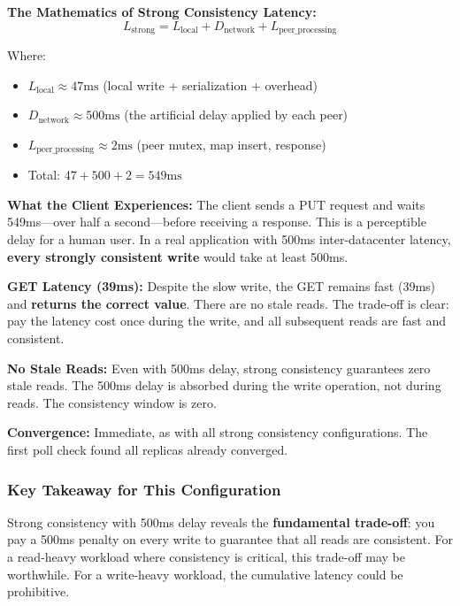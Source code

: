 \documentclass[10pt,a4paper]{article}
\begin{document}
\textbf{The Mathematics of Strong Consistency Latency:}
\begin{equation}
L_{\text{strong}} = L_{\text{local}} + D_{\text{network}} + L_{\text{peer\_processing}}
\end{equation}

Where:
\begin{itemize}
    \item $L_{\text{local}} \approx 47\text{ms}$ (local write + serialization + overhead)
    \item $D_{\text{network}} \approx 500\text{ms}$ (the artificial delay applied by each peer)
    \item $L_{\text{peer\_processing}} \approx 2\text{ms}$ (peer mutex, map insert, response)
    \item Total: $47 + 500 + 2 = 549\text{ms}$
\end{itemize}

\textbf{What the Client Experiences:} The client sends a PUT request and waits 549ms---over half a second---before receiving a response. This is a perceptible delay for a human user. In a real application with 500ms inter-datacenter latency, \textbf{every strongly consistent write} would take at least 500ms.

\textbf{GET Latency (39ms):} Despite the slow write, the GET remains fast (39ms) and \textbf{returns the correct value}. There are no stale reads. The trade-off is clear: pay the latency cost once during the write, and all subsequent reads are fast and consistent.

\textbf{No Stale Reads:} Even with 500ms delay, strong consistency guarantees zero stale reads. The 500ms delay is absorbed during the write operation, not during reads. The consistency window is zero.

\textbf{Convergence:} Immediate, as with all strong consistency configurations. The first poll check found all replicas already converged.

\subsubsection{Key Takeaway for This Configuration}

Strong consistency with 500ms delay reveals the \textbf{fundamental trade-off}: you pay a 500ms penalty on every write to guarantee that all reads are consistent. For a read-heavy workload where consistency is critical, this trade-off may be worthwhile. For a write-heavy workload, the cumulative latency could be prohibitive.
\end{document}
